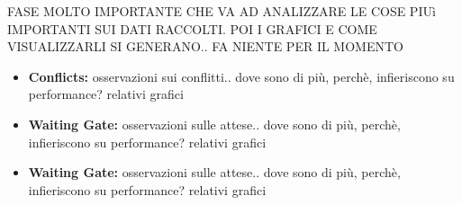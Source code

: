 \documentclass[12pt]{article}
\begin{document}
FASE MOLTO IMPORTANTE CHE VA AD ANALIZZARE LE COSE PIUì IMPORTANTI SUI DATI RACCOLTI. POI I GRAFICI E COME VISUALIZZARLI SI GENERANO.. FA NIENTE PER IL MOMENTO

\begin{itemize}
    \item \textbf{Conflicts: } osservazioni sui conflitti.. dove sono di più, perchè, infieriscono su performance? relativi grafici 
    \item \textbf{Waiting Gate: } osservazioni sulle attese.. dove sono di più, perchè, infieriscono su performance? relativi grafici 
    \item \textbf{Waiting Gate: } osservazioni sulle attese.. dove sono di più, perchè, infieriscono su performance? relativi grafici 
\end{itemize}
\end{document}
